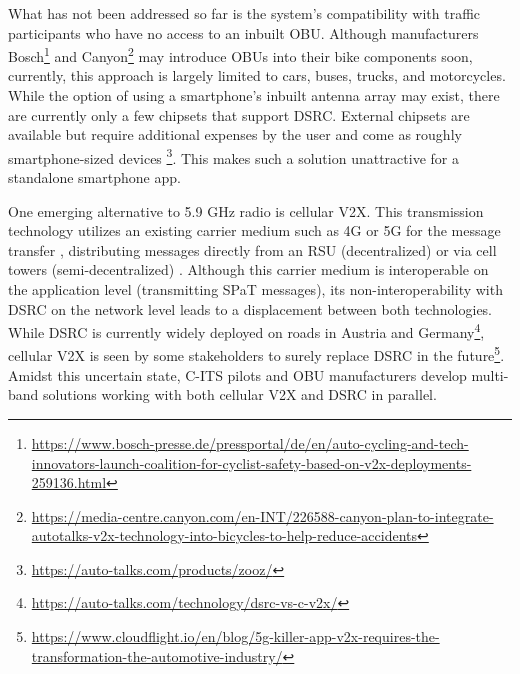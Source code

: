 What has not been addressed so far is the system's compatibility with traffic participants who have no access to an inbuilt OBU. Although manufacturers Bosch\footnote{\url{https://www.bosch-presse.de/pressportal/de/en/auto-cycling-and-tech-innovators-launch-coalition-for-cyclist-safety-based-on-v2x-deployments-259136.html}} and Canyon\footnote{\url{https://media-centre.canyon.com/en-INT/226588-canyon-plan-to-integrate-autotalks-v2x-technology-into-bicycles-to-help-reduce-accidents}} may introduce OBUs into their bike components soon, currently, this approach is largely limited to cars, buses, trucks, and motorcycles. While the option of using a smartphone's inbuilt antenna array may exist, there are currently only a few chipsets that support DSRC. External chipsets are available but require additional expenses by the user and come as roughly smartphone-sized devices \cite{kim_vulnerable_2017}\footnote{\url{https://auto-talks.com/products/zooz/}}. This makes such a solution unattractive for a standalone smartphone app.

One emerging alternative to 5.9 GHz radio is cellular V2X. This transmission technology utilizes an existing carrier medium such as 4G or 5G for the message transfer \cite{xia_field_2012, zweck_traffic_2013, bhattacharyya_assessing_2022}, distributing messages directly from an RSU (decentralized) \cite{bohm_radio_2017} or via cell towers (semi-decentralized) \cite{strobl_c-its_2019, jacob_ivs-kom_2020}. Although this carrier medium is interoperable on the application level (transmitting SPaT messages), its non-interoperability with DSRC \cite{bohm_radio_2017} on the network level leads to a displacement between both technologies. While DSRC is currently widely deployed on roads in Austria and Germany\footnote{\url{https://auto-talks.com/technology/dsrc-vs-c-v2x/}}, cellular V2X is seen by some stakeholders to surely replace DSRC in the future\footnote{\label{cloudflight-article}\url{https://www.cloudflight.io/en/blog/5g-killer-app-v2x-requires-the-transformation-the-automotive-industry/}}. Amidst this uncertain state, C-ITS pilots \cite{strobl_c-its_2019} and OBU manufacturers \cite{jacob_ivs-kom_2020} develop multi-band solutions working with both cellular V2X and DSRC in parallel.

